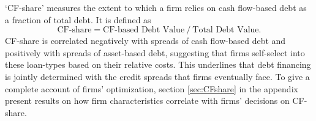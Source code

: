 \documentclass[12pt]{article}
\begin{document}
`CF-share' measures the extent to which a firm relies on cash flow-based debt as a fraction of total debt. It is defined as 
\begin{equation*}
    \text{CF-share} = \text{CF-based Debt Value} \  / \  \text{Total Debt Value}.
\end{equation*}
CF-share is correlated negatively with spreads of cash flow-based debt and positively with spreads of asset-based debt, suggesting that firms self-select into these loan-types based on their relative costs. This underlines that debt financing is jointly determined with the credit spreads that firms eventually face. To give a complete account of firms' optimization, section \ref{sec:CFshare} in the appendix present results on how firm characteristics correlate with firms' decisions on CF-share.

\begin{table}[H]
    \centering
    \caption{The Determinants of Credit Spreads}
    \label{tab:spread_table_new}
\end{table}
\end{document}
